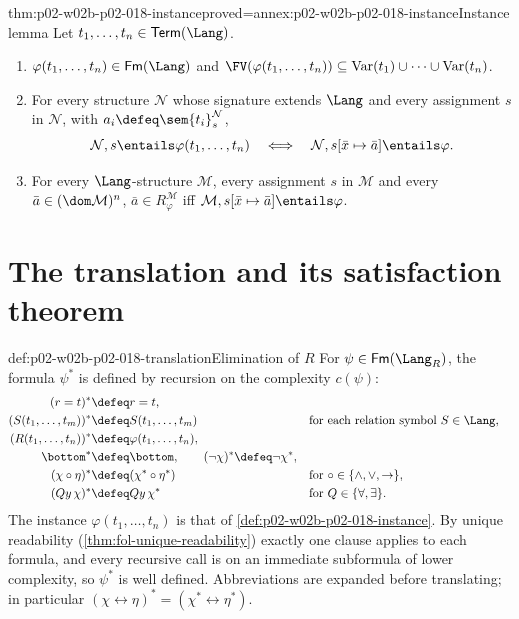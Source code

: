 \begin{hblemma}{thm:p02-w02b-p02-018-instance}{proved=annex:p02-w02b-p02-018-instance}{Instance lemma}
Let \(t_1,\ldots,t_n\in\mathsf{Term}(\Lang)\).
\begin{enumerate}
 \item \(\varphi(t_1,\ldots,t_n)\in\mathsf{Fm}(\Lang)\) and
       \(\FV(\varphi(t_1,\ldots,t_n))\subseteq
       \operatorname{Var}(t_1)\cup\cdots\cup\operatorname{Var}(t_n)\).
 \item For every structure \(\mathcal N\) whose signature extends
       \(\Lang\) and every assignment \(s\) in \(\mathcal N\), with
       \(a_i\defeq\sem{t_i}^{\mathcal N}_s\),
       \[
        \mathcal N,s\entails\varphi(t_1,\ldots,t_n)
        \quad\Longleftrightarrow\quad
        \mathcal N,s[\bar x\mapsto\bar a]\entails\varphi .
       \]
 \item For every \(\Lang\)-structure \(\mathcal M\), every assignment \(s\)
       in \(\mathcal M\) and every \(\bar a\in(\dom\mathcal M)^n\),
       \(\bar a\in R^{\mathcal M}_{\varphi}\) iff
       \(\mathcal M,s[\bar x\mapsto\bar a]\entails\varphi\).
\end{enumerate}
\end{hblemma}

\section{The translation and its satisfaction theorem}
\label{sec:p02-w02b-p02-018-translation}

\begin{hbdefinition}{def:p02-w02b-p02-018-translation}{Elimination of \(R\)}
For \(\psi\in\mathsf{Fm}(\Lang_R)\), the formula \(\psi^{*}\) is
defined by recursion on the complexity \(c(\psi)\):
\[
\begin{aligned}
 (r=t)^{*}&\defeq r=t,\\
 (S(t_1,\ldots,t_m))^{*}&\defeq S(t_1,\ldots,t_m)
   &&\text{for each relation symbol }S\in\Lang,\\
 (R(t_1,\ldots,t_n))^{*}&\defeq\varphi(t_1,\ldots,t_n),\\
 \bottom^{*}&\defeq\bottom,\qquad
 (\neg\chi)^{*}\defeq\neg\chi^{*},\\
 (\chi\circ\eta)^{*}&\defeq(\chi^{*}\circ\eta^{*})
   &&\text{for }\circ\in\{\land,\lor,\to\},\\
 (Qy\,\chi)^{*}&\defeq Qy\,\chi^{*}
   &&\text{for }Q\in\{\forall,\exists\}.
\end{aligned}
\]
The instance \(\varphi(t_1,\ldots,t_n)\) is that of
\cref{def:p02-w02b-p02-018-instance}.  By unique readability
(\cref{thm:fol-unique-readability}) exactly one clause applies to each
formula, and every recursive call is on an immediate subformula of lower
complexity, so \(\psi^{*}\) is well defined.  Abbreviations are expanded
before translating; in particular
\((\chi\leftrightarrow\eta)^{*}=(\chi^{*}\leftrightarrow\eta^{*})\).
\end{hbdefinition}

